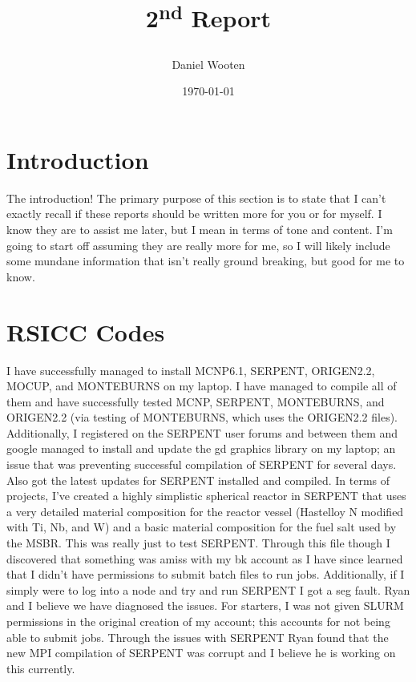 \documentclass[12pt]{article}
\title{2\textsuperscript{nd} Report \\ {\small \date{\today}}}
\author{Daniel Wooten}
\begin{document}
\maketitle

\section{Introduction}
The introduction! The primary purpose of this section is to state that I can't exactly
recall if these reports should be written more for you or for myself. I know they are to
assist me later, but I mean in terms of tone and content. I'm going to start off assuming
they are really more for me, so I will likely include some mundane information that isn't
really ground breaking, but good for me to know.

\section{RSICC Codes}
I have successfully managed to install MCNP6.1, SERPENT, ORIGEN2.2, MOCUP, and
MONTEBURNS on my laptop. I have managed to compile all of them and have successfully
tested MCNP, SERPENT, MONTEBURNS, and ORIGEN2.2 (via testing of MONTEBURNS, which uses
the ORIGEN2.2 files).
Additionally, I registered on the SERPENT user forums and between them and google managed
to install and update the gd graphics library on my laptop; an issue that was preventing
successful compilation of SERPENT for several days. Also got the latest updates for
SERPENT installed and compiled.
In terms of projects, I've created a highly simplistic spherical reactor in SERPENT
that uses a very detailed material composition for the reactor vessel (Hastelloy N
modified with Ti, Nb, and W) and a basic material composition for the fuel salt used
by the MSBR. This was really just to test SERPENT.
Through this file though I discovered that something was amiss with my bk account as I
have since learned that I didn't have permissions to submit batch files to run jobs. Additionally,
if I simply were to log into a node and try and run SERPENT I got a seg fault. Ryan and I
believe we have diagnosed the issues. For starters, I was not given SLURM permissions
in the original creation of my account; this accounts for not being able to submit jobs.
Through the issues with SERPENT Ryan found that the new MPI compilation of SERPENT
was corrupt and I believe he is working on this currently.
\end{document}
